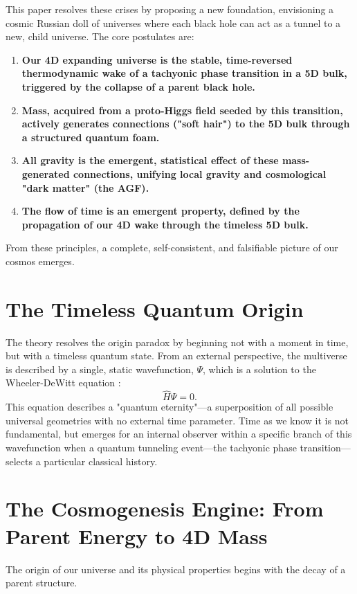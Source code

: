 \documentclass[aps,prd,onecolumn,10pt,superscriptaddress,nofootinbib,floatfix]{revtex4-2}
\begin{document}
This paper resolves these crises by proposing a new foundation, envisioning a cosmic Russian doll of universes where each black hole can act as a tunnel to a new, child universe. The core postulates are:
\begin{enumerate}
    \item \textbf{Our 4D expanding universe is the stable, time-reversed thermodynamic wake of a tachyonic phase transition in a 5D bulk, triggered by the collapse of a parent black hole.}
    \item \textbf{Mass, acquired from a proto-Higgs field seeded by this transition, actively generates connections ("soft hair") to the 5D bulk through a structured quantum foam.}
    \item \textbf{All gravity is the emergent, statistical effect of these mass-generated connections, unifying local gravity and cosmological "dark matter" (the AGF).}
    \item \textbf{The flow of time is an emergent property, defined by the propagation of our 4D wake through the timeless 5D bulk.}
\end{enumerate}
From these principles, a complete, self-consistent, and falsifiable picture of our cosmos emerges.

\section{The Timeless Quantum Origin}
The theory resolves the origin paradox by beginning not with a moment in time, but with a timeless quantum state. From an external perspective, the multiverse is described by a single, static wavefunction, $\Psi$, which is a solution to the Wheeler-DeWitt equation \cite{DeWitt1967}:
\begin{equation}
    \hat{H}\Psi = 0.
\end{equation}
This equation describes a "quantum eternity"—a superposition of all possible universal geometries with no external time parameter. Time as we know it is not fundamental, but emerges for an internal observer within a specific branch of this wavefunction when a quantum tunneling event—the tachyonic phase transition—selects a particular classical history.

\section{The Cosmogenesis Engine: From Parent Energy to 4D Mass}
The origin of our universe and its physical properties begins with the decay of a parent structure. 
\end{document}
